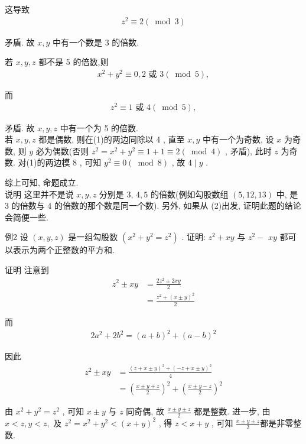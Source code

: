 这导致
\begin{align*}
	z^{2} \equiv 2(\bmod 3)
\end{align*}

矛盾. 故 $x ,  y$ 中有一个数是 3 的倍数.

若 $x ,  y ,  z$ 都不是 5 的倍数,则
\begin{align*}
	x^{2}+y^{2} \equiv 0,2 \text { 或 } 3(\bmod 5),
\end{align*}

而
\begin{align*}
	z^{2} \equiv 1 \text { 或 } 4(\bmod 5) ,
\end{align*}

矛盾. 故 $x ,  y ,  z$ 中有一个为 5 的倍数. \\
若 $x ,  y ,  z$ 都是偶数, 则在(1)的两边同除以 4 , 直至 $x ,  y$ 中有一个为奇数, 设 $x$ 为奇数, 则 $y$ 必为偶数(否则 $z^{2}=x^{2}+y^{2} \equiv 1+1 \equiv 2(\bmod 4)$ , 矛盾), 此时 $z$ 为奇数. 对(1)的两边模 8 , 可知 $y^{2} \equiv 0(\bmod 8)$ , 故 $4 \mid y$ .

综上可知, 命题成立. \\
说明 这里并不是说 $x ,  y ,  z$ 分别是 3,  $4 ,  5$ 的倍数(例如勾股数组 $(5,12,13)$ 中, 是 3 的倍数与 4 的倍数的那个数是同一个数). 另外, 如果从 (2)出发, 证明此题的结论会简便一些.

例2 设 $(x, y, z)$ 是一组勾股数 $\left(x^{2}+y^{2}=z^{2}\right)$ . 证明: $z^{2}+x y$ 与 $z^{2}-$ $x y$ 都可以表示为两个正整数的平方和.

证明 注意到\begin{align}
	z^{2} \pm x y & =\frac{2 z^{2} \pm 2 x y}{2}   \\
	              & =\frac{z^{2}+(x \pm y)^{2}}{2}
\end{align}

而
\begin{align*}
	2 a^{2}+2 b^{2}=(a+b)^{2}+(a-b)^{2}
\end{align*}

因此\begin{align}
	z^{2} \pm x y & =\frac{(z+x \pm y)^{2}+(-z+x \pm y)^{2}}{4}                                \\
	              & =\left(\frac{x \pm y+z}{2}\right)^{2}+\left(\frac{x \pm y-z}{2}\right)^{2}
\end{align}

由 $x^{2}+y^{2}=z^{2}$ , 可知 $x \pm y$ 与 $z$ 同奇偶, 故 $\frac{x \pm y \pm z}{2}$ 都是整数. 进一步, 由 $x<z, y<z , $ 及 $z^{2}=x^{2}+y^{2}<(x+y)^{2}$ , 得 $z<x+y$ , 可知 $\frac{x \pm y \pm z}{2}$都是非零整数.


